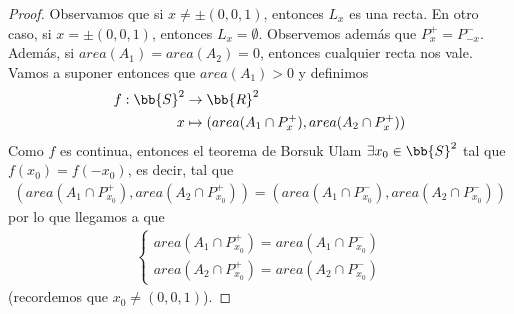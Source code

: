 \begin{teo}
\begin{proof}
        Observamos que si $x\neq \pm (0,0,1)$, entonces $L_x$ es una recta. En otro caso, si $x= \pm (0,0,1)$, entonces $L_x=\emptyset$. Observemos además que $P_x^+=P_{-x}^-$. Además, si $area(A_1)=area(A_2)=0$, entonces cualquier recta nos vale. Vamos a suponer entonces que $area(A_1)>0$ y definimos
        \begin{align*}
            f: \bb{S}^2 & \to \bb{R}^2\\
            x & \mapsto (area(A_1\cap P_x^+), area(A_2\cap P_x^+))
        \end{align*}
        Como $f$ es continua, entonces el teorema de Borsuk Ulam $\exists x_0\in \bb{S}^2$ tal que $f(x_0)=f(-x_0)$, es decir, tal que
        \begin{gather*}
            (area(A_1\cap P_{x_0}^+), area(A_2\cap P_{x_0}^+)) = (area(A_1\cap P_{x_0}^-), area(A_2\cap P_{x_0}^-))
        \end{gather*}
        por lo que llegamos a que 
        \begin{gather*}
            \left\{
                \begin{array}{l}
                    area(A_1\cap P_{x_0}^+) = area(A_1\cap P_{x_0}^-)\\
                    area(A_2\cap P_{x_0}^+) = area(A_2\cap P_{x_0}^-)
                \end{array}
            \right.
        \end{gather*}
        (recordemos que $x_0\neq (0,0,1)$).
    \end{proof}
\end{teo}


